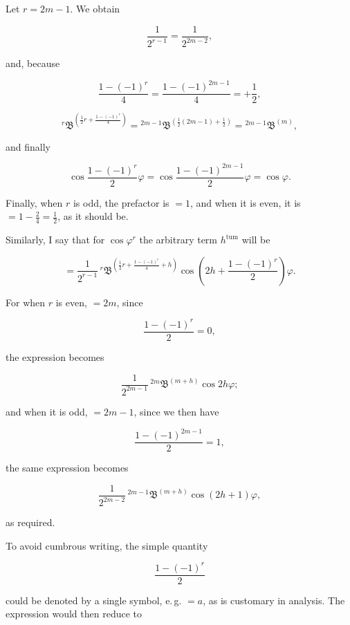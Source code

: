 Let $r=2m-1$. We obtain

\[
\frac{1}{2^{r-1}} = \frac{1}{2^{2m-2}},
\]

\noindent and, because

\[
\frac{1-(-1)^r}{4} = \frac{1-(-1)^{2m-1}}{4} = +\frac{1}{2},
\]

\[
{}^{r}\mathfrak{B}^{\left(\frac{1}{2}r+\frac{1-(-1)^r}{4}\right)} = {}^{2m-1}\mathfrak{B}^{\left(\frac{1}{2}(2m-1)+\frac{1}{2}\right)} = {}^{2m-1}\mathfrak{B}^{(m)},
\]

\noindent and finally

\[
\cos\frac{1-(-1)^r}{2}\varphi = \cos\frac{1-(-1)^{2m-1}}{2}\varphi = \cos\varphi.
\]

Finally, when $r$ is odd, the prefactor is $=1$, and when it is even,
it is $=1-\tfrac{2}{4}=\tfrac{1}{2}$, as it should be.

Similarly, I say that for $\cos\varphi^r$ the arbitrary term $h^{\text{tum}}$ will be

\[
= \frac{1}{2^{r-1}}\,{}^{r}\mathfrak{B}^{\left(\frac{1}{2}r+\frac{1-(-1)^r}{4}+h\right)}\cos\left(2h+\frac{1-(-1)^r}{2}\right)\varphi.
\]

For when $r$ is even, $=2m$, since

\[
\frac{1-(-1)^r}{2} = 0,
\]

\noindent the expression becomes

\[
\frac{1}{2^{2m-1}}\,{}^{2m}\mathfrak{B}^{(m+h)}\cos2h\varphi;
\]

\noindent and when it is odd, $=2m-1$, since we then have

\[
\frac{1-(-1)^{2m-1}}{2} = 1,
\]

\noindent the same expression becomes

\[
\frac{1}{2^{2m-2}}\,{}^{2m-1}\mathfrak{B}^{(m+h)}\cos(2h+1)\varphi,
\]

\noindent as required.

To avoid cumbrous writing, the simple quantity

\[
\frac{1-(-1)^r}{2}
\]

\noindent could be denoted by a single symbol, e.\,g. $=a$, as is customary in analysis.
The expression would then reduce to
